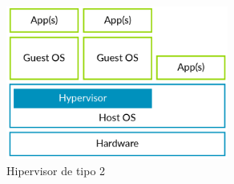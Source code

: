 \begin{itemize}
\begin{figure}[!htb]
	\centering
	\includegraphics[width=0.65\textwidth]{recursos/type2_hyp.png}
	\caption{Hipervisor de tipo 2}
	\label{fig:hyper_type2}
\end{figure}
\\
\end{itemize}

